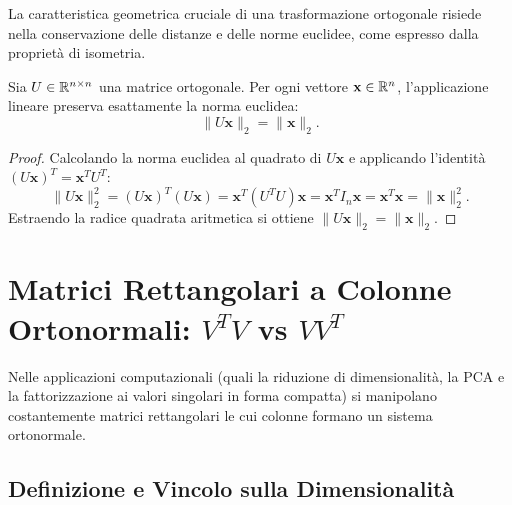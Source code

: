 La caratteristica geometrica cruciale di una trasformazione ortogonale risiede nella conservazione delle distanze e delle norme euclidee, come espresso dalla propriet\`a di isometria.

\begin{property}
\label{prop:isometria-euclidea-quadrata}
Sia $U \in \mathbb{R}^{n \times n}$ una matrice ortogonale. Per ogni vettore $\mathbf{x} \in \mathbb{R}^n$, l'applicazione lineare preserva esattamente la norma euclidea:
\begin{equation}
    \|U\mathbf{x}\|_2 = \|\mathbf{x}\|_2.
\end{equation}
\end{property}

\begin{proof}
Calcolando la norma euclidea al quadrato di $U\mathbf{x}$ e applicando l'identit\`a $(U\mathbf{x})^T = \mathbf{x}^T U^T$:
\begin{equation}
    \|U\mathbf{x}\|_2^2 = (U\mathbf{x})^T (U\mathbf{x}) = \mathbf{x}^T (U^T U) \mathbf{x} = \mathbf{x}^T I_n \mathbf{x} = \mathbf{x}^T \mathbf{x} = \|\mathbf{x}\|_2^2.
\end{equation}
Estraendo la radice quadrata aritmetica si ottiene $\|U\mathbf{x}\|_2 = \|\mathbf{x}\|_2$.
\end{proof}

\FloatBarrier
\section[Matrici Rettangolari a Colonne Ortonormali]{Matrici Rettangolari a Colonne Ortonormali: \texorpdfstring{$V^T V$}{V\textasciicircum T V} vs \texorpdfstring{$V V^T$}{V V\textasciicircum T}}

Nelle applicazioni computazionali (quali la riduzione di dimensionalit\`a, la PCA e la fattorizzazione ai valori singolari in forma compatta) si manipolano costantemente matrici rettangolari le cui colonne formano un sistema ortonormale.

\subsection{Definizione e Vincolo sulla Dimensionalit\`a}

